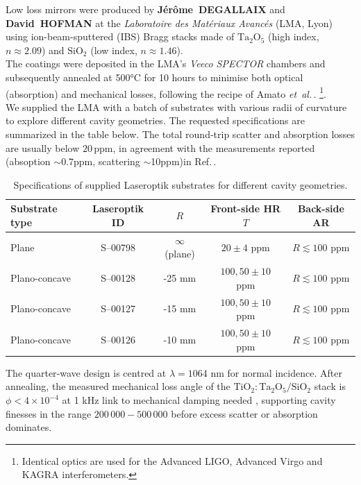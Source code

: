 Low loss mirrors were produced by \textbf{Jérôme~DEGALLAIX} and \textbf{David~HOFMAN} at the
\textit{Laboratoire des Matériaux Avancés} (LMA, Lyon) using
ion-beam-sputtered (IBS) Bragg stacks made of $\mathrm{Ta_2O_5}$ (high index,
$n\!\approx\!2.09$) and $\mathrm{SiO_2}$ (low index, $n\!\approx\!1.46$)\cite{AmatoPhD,LMA_IBS}. \\
The coatings were deposited in the LMA's \textit{Veeco SPECTOR} chambers and subsequently annealed at 500°C for 10 hours to minimise both optical (absorption) and mechanical losses, following the recipe of Amato \textit{et~al.}\,\cite{AmatoPhD}.
\footnote{Identical optics are used for the Advanced LIGO, Advanced Virgo
and KAGRA interferometers\cite{LIGO_optics}.}.\\

We supplied the LMA with a batch of substrates with various radii of curvature to explore different cavity geometries. The requested specifications are summarized in the table below. The total round‐trip scatter and absorption losses are usually below $ 20\,$ppm, in agreement with the measurements reported (absoption $\sim$0.7ppm, scattering $\sim$10ppm)in Ref.\,\cite{AmatoPhD}.



\begin{table}[h!]
\centering
\begin{tabular}{|l|c|c|c|c|}
\hline
\textbf{Substrate type} & \textbf{Laseroptik ID} & \textbf{$R$} & \textbf{Front-side HR $T$} & \textbf{Back-side AR} \\
\hline
Plane & S--00798 & $\infty$ (plane) & $20 \pm 4$ ppm & $R \lesssim 100$ ppm \\
\hline
Plano-concave & S--00128 & -25 mm & $100 , 50 \pm 10$ ppm & $R \lesssim 100$ ppm  \\
\hline
Plano-concave & S--00127 & -15 mm & $100 , 50  \pm 10$ ppm & $R \lesssim 100$ ppm  \\
\hline
Plano-concave & S--00126 & -10 mm & $100 , 50  \pm 10$ ppm & $R \lesssim 100$ ppm  \\
\hline
\end{tabular}
\caption{Specifications of supplied Laseroptik substrates for different cavity geometries.}
\end{table}



The quarter‐wave design is centred at $\lambda = 1064$ nm for normal incidence.  After annealing, the measured mechanical loss angle of the $\mathrm{TiO_2\!:\!Ta_2O_5}/\mathrm{SiO_2}$ stack is $\phi < 4\times10^{-4}$ at 1 kHz  \color{red} link to mechanical damping needed \color{black}, supporting cavity finesses in the range $200\,000-500\,000$ before excess scatter or absorption dominates\cite{AmatoPhD}.

